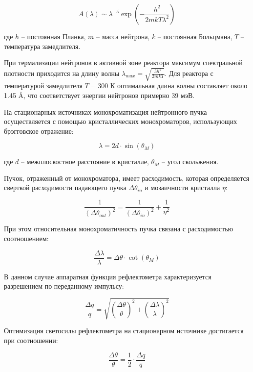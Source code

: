 \documentclass[a4paper]{article}
\begin{document}
\begin{equation}
A(\lambda) \sim \lambda^{-5} \exp\left(-\frac{h^2}{2mk T\lambda^2}\right)
\end{equation}

где $h$ -- постоянная Планка, $m$ -- масса нейтрона, $k$ -- постоянная Больцмана, $T$ -- температура замедлителя.

При термализации нейтронов в активной зоне реактора максимум спектральной плотности приходится на длину волны $\lambda_{max} = \sqrt{\frac{5h^2}{2mkT}}$. Для реактора с температурой замедлителя $T = 300$ К оптимальная длина волны составляет около 1.45 \AA, что соответствует энергии нейтронов примерно 39 мэВ.

На стационарных источниках монохроматизация нейтронного пучка осуществляется с помощью кристаллических монохроматоров, использующих брэгговское отражение:

\begin{equation}
\lambda = 2d \cdot \sin(\theta_M)
\end{equation}

где $d$ -- межплоскостное расстояние в кристалле, $\theta_M$ -- угол скольжения.

Пучок, отраженный от монохроматора, имеет расходимость, 
которая определяется сверткой расходимости падающего пучка $\Delta\theta_{in}$ и мозаичности кристалла $\eta$:

\begin{equation}
\frac{1}{(\Delta\theta_{out})^2} = \frac{1}{(\Delta\theta_{in})^2} + \frac{1}{\eta^2}
\end{equation}

При этом относительная монохроматичность пучка связана с расходимостью соотношением:

\begin{equation}
\frac{\Delta\lambda}{\lambda} = \Delta\theta \cdot \cot(\theta_M)
\end{equation}

В данном случае аппаратная функция рефлектометра характеризуется разрешением по переданному импульсу:

\begin{equation}
\frac{\Delta q}{q} = \sqrt{\left(\frac{\Delta\theta}{\theta}\right)^2 + \left(\frac{\Delta\lambda}{\lambda}\right)^2}
\end{equation}

Оптимизация светосилы рефлектометра на стационарном источнике достигается при соотношении:

\begin{equation}
\frac{\Delta\theta}{\theta} = \frac{1}{2} \cdot \frac{\Delta q}{q}
\end{equation}
\end{document}

